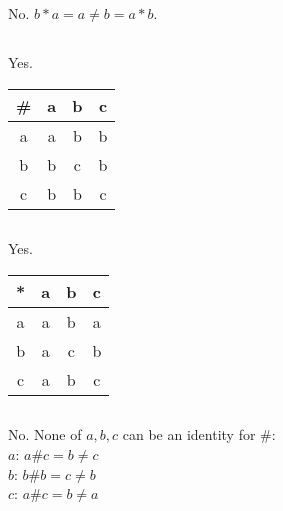 \documentclass{article}
\begin{document}
\subsection{} %
No. $b*a=a\neq b=a*b$.
\subsection{} %
Yes.
\newline
\newline
\begin{tabular}{c|ccc}
	\# & a & b & c \\
	\hline
	a & a & b & b \\
	b & b & c & b \\
	c & b & b & c \\
\end{tabular}
\subsection{} %
Yes.
\newline
\newline
\begin{tabular}{c|ccc}
	* & a & b & c \\
	\hline
	a & a & b & a \\
	b & a & c & b \\
	c & a & b & c \\
\end{tabular}
\subsection{} %
No. None of $a,b,c$ can be an identity for \#:\\
$a$: $a\#c=b\neq c$\\
$b$: $b\#b=c\neq b$\\
$c$: $a\#c=b\neq a$\\
\end{document}
